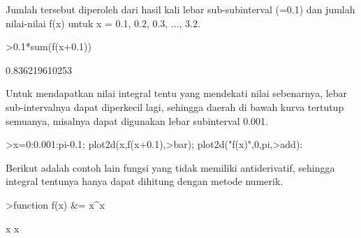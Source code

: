 \documentclass[a4paper,10pt]{article}
\begin{document}
\begin{eulernotebook}
\begin{eulercomment}
\begin{eulercomment}
\begin{eulercomment}
\begin{eulercomment}
\begin{eulercomment}
\begin{eulercomment}
\begin{eulercomment}
\begin{eulercomment}
\begin{eulercomment}
\begin{eulercomment}
\begin{eulercomment}
\begin{eulercomment}
\begin{eulercomment}
\begin{eulercomment}
\begin{eulercomment}
\begin{eulercomment}
\begin{eulercomment}
\begin{eulercomment}
\begin{eulercomment}
\begin{eulercomment}
\begin{eulercomment}
\begin{eulercomment}
\begin{eulercomment}
\begin{eulercomment}
\begin{eulercomment}
Jumlah tersebut diperoleh dari hasil kali lebar sub-subinterval (=0.1)
dan jumlah nilai-nilai f(x) untuk x = 0.1, 0.2, 0.3, ..., 3.2.
\end{eulercomment}
\begin{eulerprompt}
>0.1*sum(f(x+0.1))
\end{eulerprompt}
\begin{euleroutput}
  0.836219610253
\end{euleroutput}
\begin{eulercomment}
Untuk mendapatkan nilai integral tentu yang mendekati nilai
sebenarnya, lebar sub-intervalnya dapat diperkecil lagi, sehingga
daerah di bawah kurva tertutup semuanya, misalnya dapat digunakan
lebar subinterval 0.001.

\end{eulercomment}
\begin{eulerprompt}
>x=0:0.001:pi-0.1; plot2d(x,f(x+0.1),>bar); plot2d("f(x)",0,pi,>add):
\end{eulerprompt}
\begin{eulercomment}
Berikut adalah contoh lain fungsi yang tidak memiliki antiderivatif,
sehingga integral tentunya hanya dapat dihitung dengan metode numerik.
\end{eulercomment}
\begin{eulerprompt}
>function f(x) &= x^x
\end{eulerprompt}
\begin{euleroutput}
  
                                     x
                                    x
  

\end{euleroutput}
\end{eulercomment}
\end{eulercomment}
\end{eulercomment}
\end{eulercomment}
\end{eulercomment}
\end{eulercomment}
\end{eulercomment}
\end{eulercomment}
\end{eulercomment}
\end{eulercomment}
\end{eulercomment}
\end{eulercomment}
\end{eulercomment}
\end{eulercomment}
\end{eulercomment}
\end{eulercomment}
\end{eulercomment}
\end{eulercomment}
\end{eulercomment}
\end{eulercomment}
\end{eulercomment}
\end{eulercomment}
\end{eulercomment}
\end{eulercomment}
\end{eulernotebook}
\end{document}
